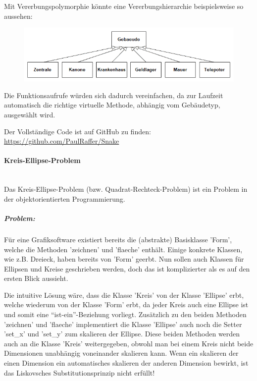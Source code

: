 					Mit Vererbungspolymorphie könnte eine Vererbungshierarchie beispielsweise so aussehen:
					\begin{figure}[H]
						\includegraphics[width=\textwidth]{polymorphie/universell/vererbung/beispiele/snake/gebaeude.png}
					\end{figure}
					
					Die Funktionsaufrufe würden sich dadurch vereinfachen, da zur Laufzeit automatisch die richtige virtuelle
					Methode, abhängig vom Gebäudetyp, ausgewählt wird.
					\UseRawInputEncoding{}
					
					Der Vollständige Code ist auf GitHub zu finden: \url{https://github.com/PaulRaffer/Snake}
				
			\paragraph{Kreis-Ellipse-Problem}\mbox{}\\
				Das Kreis-Ellipse-Problem (bzw. Quadrat-Rechteck-Problem) ist ein Problem in der objektorientierten
				Programmierung.
				
				\subparagraph*{Problem:}
					Für eine Grafiksoftware existiert bereits die (abstrakte) Basisklasse 'Form', welche die Methoden
					'zeichnen' und 'flaeche' enthält. Einige konkrete Klassen, wie z.B. Dreieck, haben bereits von 'Form'
					geerbt. Nun sollen auch Klassen für Ellipsen und Kreise geschrieben werden, doch das ist komplizierter
					als es auf den ersten Blick aussieht.
					
					Die intuitive Lösung wäre, dass die Klasse 'Kreis' von der Klasse 'Ellipse' erbt, welche wiederum von
					der Klasse 'Form' erbt, da jeder Kreis auch eine Ellipse ist und somit eine ``ist-ein''-Beziehung
					vorliegt. Zusätzlich zu den beiden Methoden 'zeichnen' und 'flaeche' implementiert die Klasse 'Ellipse'
					auch noch die Setter 'set\_x' und 'set\_y' zum skalieren der Ellipse. Diese beiden Methoden werden auch
					an die Klasse 'Kreis' weitergegeben, obwohl man bei einem Kreis nicht beide Dimensionen unabhängig
					voneinander skalieren kann. Wenn ein skalieren der einen Dimension ein automatisches skalieren der anderen
					Dimension bewirkt, ist das Liskovsches Substitutionsprinzip nicht erfüllt!
				
